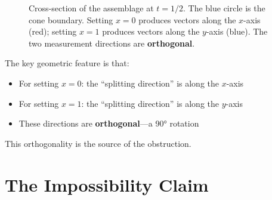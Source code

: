 \documentclass[11pt,a4paper]{article}
\theoremstyle{definition}
\begin{document}
\begin{figure}[h]
\centering
{}
\caption{Cross-section of the assemblage at $t = 1/2$. The blue circle is the cone boundary. Setting $x=0$ produces vectors along the $x$-axis (red); setting $x=1$ produces vectors along the $y$-axis (blue). The two measurement directions are \textbf{orthogonal}.}
\end{figure}

The key geometric feature is that:
\begin{itemize}
    \item For setting $x = 0$: the ``splitting direction'' is along the $x$-axis
    \item For setting $x = 1$: the ``splitting direction'' is along the $y$-axis
    \item These directions are \textbf{orthogonal}---a 90° rotation
\end{itemize}

This orthogonality is the source of the obstruction.

\section{The Impossibility Claim}
\end{document}
